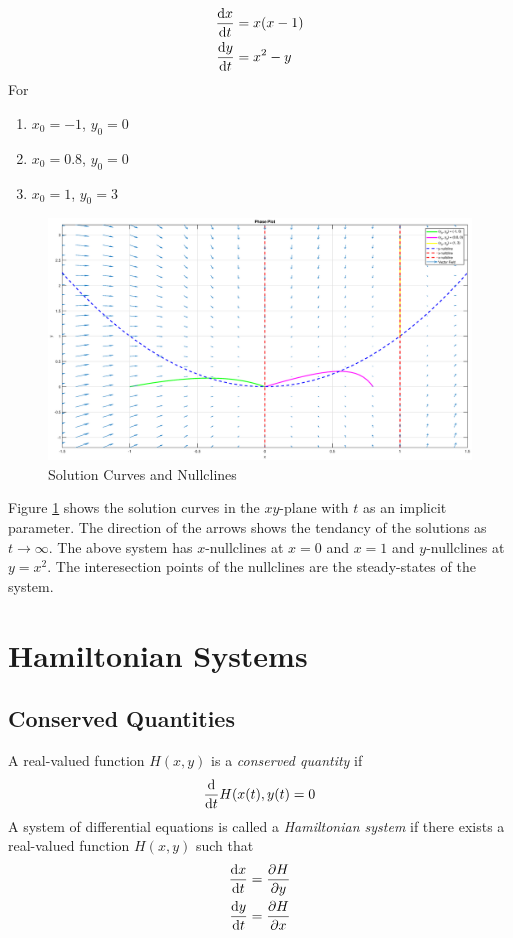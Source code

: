 \documentclass[12pt,1in]{article}
\newenvironment{Example}[2][Example]{\begin{trivlist}
		\item[\hskip \labelsep {\bfseries #1}\hskip \labelsep {\bfseries #2.}]}{\end{trivlist}}
\begin{document}
\begin{Example}{3}
	\cite[p.~487]{diff_eq}
	\begin{align*}
	\derivative{x}{t} &= x(x - 1)\\
	\derivative{y}{t} &= x^2 - y
	\end{align*}
	For 
	\begin{enumerate}
		\item $x_0 = -1$, $y_0 = 0$
		\item $x_0 = 0.8$, $y_0 = 0$
		\item $x_0 = 1$, $y_0 = 3$
	\end{enumerate}
\begin{figure}[H]
	\centering
	\includegraphics[width=1\linewidth]{Figures/example_3_phase}
	\caption{Solution Curves and Nullclines}
	\label{fig:example3}
\end{figure}
Figure \ref{fig:example3} shows the solution curves in the $xy$-plane with $t$ as an implicit parameter. The direction of the arrows shows the tendancy of the solutions as $t\rightarrow\infty$. The above system has $x$-nullclines at $x = 0$ and $x = 1$ and $y$-nullclines at $y = x^2$. The interesection points of the nullclines are the steady-states of the system. 
 
\end{Example}
\section{Hamiltonian Systems}
\subsection{Conserved Quantities}
A real-valued function $H(x,y)$ is a \textit{conserved quantity} if
\begin{align}
\derivative{}{t}H(x(t), y(t) = 0
\end{align}
A system of differential equations is called a \textit{Hamiltonian system} if there exists a real-valued function $H(x,y)$ such that 
\begin{align}
\derivative{x}{t} &= \frac{\partial H}{\partial y} \label{ham_1} \\
\derivative{y}{t} &= \frac{\partial H}{\partial x} \label{ham_2}
\end{align}
\end{document}
